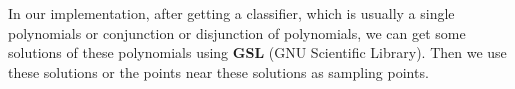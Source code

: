 In our implementation, after getting a classifier, which is usually a single polynomials or conjunction or disjunction of polynomials,
we can get some solutions of these polynomials using \textbf{GSL} (GNU Scientific Library).
Then we use these solutions or the points near these solutions as sampling points.